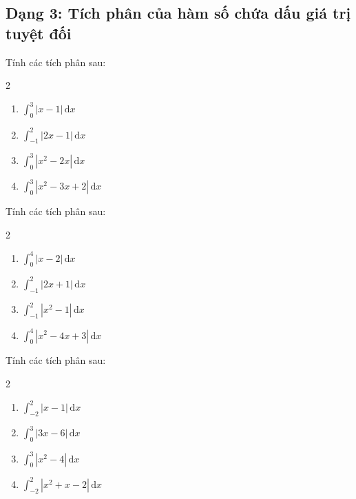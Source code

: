 \documentclass[12pt]{article}
\begin{document}
	\subsection{Dạng 3: Tích phân của hàm số chứa dấu giá trị tuyệt đối}
	\begin{btxanh}
		Tính các tích phân sau:
		\begin{multicols}{2}
			\begin{enumerate}[label=\alph*)]
				\item $\displaystyle \int_0^3 |x - 1|\,\mathrm{d}x$
				\item $\displaystyle \int_{-1}^2 |2x - 1|\,\mathrm{d}x$
				\item $\displaystyle \int_0^3 |x^2 - 2x|\,\mathrm{d}x$
				\item $\displaystyle \int_0^3 |x^2 - 3x + 2|\,\mathrm{d}x$
			\end{enumerate}
		\end{multicols}
	\end{btxanh}
	
	\begin{btvang}
		Tính các tích phân sau:
		\begin{multicols}{2}
			\begin{enumerate}[label=\alph*)]
				\item $\displaystyle \int_0^4 |x - 2|\,\mathrm{d}x$
				\item $\displaystyle \int_{-1}^2 |2x + 1|\,\mathrm{d}x$
				\item $\displaystyle \int_{-1}^2 |x^2 - 1|\,\mathrm{d}x$
				\item $\displaystyle \int_0^4 |x^2 - 4x + 3|\,\mathrm{d}x$
			\end{enumerate}
		\end{multicols}
	\end{btvang}
	
	\begin{btdo}
		Tính các tích phân sau:
		\begin{multicols}{2}
			\begin{enumerate}[label=\alph*)]
				\item $\displaystyle \int_{-2}^2 |x - 1|\,\mathrm{d}x$
				\item $\displaystyle \int_0^3 |3x - 6|\,\mathrm{d}x$
				\item $\displaystyle \int_0^3 |x^2 - 4|\,\mathrm{d}x$
				\item $\displaystyle \int_{-2}^2 |x^2 + x - 2|\,\mathrm{d}x$
			\end{enumerate}
		\end{multicols}
	\end{btdo}
	
\end{document}
